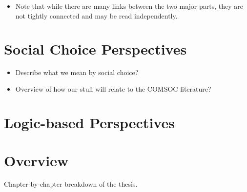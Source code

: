 \begin{notes}
\begin{itemize}
        \item Note that while there are many links between the two major parts,
              they are not tightly connected and may be read independently.

    \end{itemize}
\end{notes}

\section{Social Choice Perspectives}

\begin{notes}
    \begin{itemize}
        \item Describe what we mean by social choice?
        \item Overview of how our stuff will relate to the COMSOC literature?
    \end{itemize}
\end{notes}

\section{Logic-based Perspectives}

\section{Overview}

\begin{notes}
    Chapter-by-chapter breakdown of the thesis.
\end{notes}
